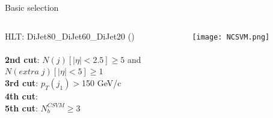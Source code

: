 \begin{frame}{Basic selection}
\vspace{-.2cm}

\begin{columns}
\begin{column}{.50\textwidth}
\begin{block}{}\scriptsize
\tiny{HLT: DiJet80\_DiJet60\_DiJet20 ()}%
\\\scriptsize{
\\
\textbf{2nd cut}: $N(j)[|\eta|<2.5]\ge 5$ and \\
\hspace{1.1cm} $N(extra\; j)[|\eta|<5]\ge 1$\\
\textbf{3rd cut}: $p_{T}(j_{1})>$150 GeV/c\\
\textbf{4th cut}: \\
\textbf{5th cut}: $N^{CSVM}_{b}\ge 3$}%
\end{block}
\end{column}

\begin{column}{.50\textwidth}
\begin{figure}[!Hhtbp]
  \begin{center}
    \texttt{[image: NCSVM.png]}
  \end{center}
\end{figure}
\end{column}

\end{columns}

\end{frame}

